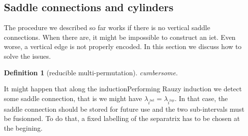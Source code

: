 \documentclass{article}
\newtheorem{definition}{Definition}
\newcommand{\commv}[1]{{\color{red!50!gray}{#1}}}
\begin{document}
\commv{TODO: implement the reduction algorithm that consists in reducing
a multi-iet to an iet via
\begin{enumerate}
\item if a gluing is available, do it
\item if there is none, perform Rauzy inductions until there is one
\end{enumerate}}

\subsection{Saddle connections and cylinders}
The procedure we described so far works if there is no vertical saddle connections.
When there are, it might be impossible to construct an iet. Even worse, a vertical
edge is not properly encoded. In this section we discuss how to solve the issues.

\begin{definition}[reducible multi-permutation]
cumbersome.
\end{definition}

It might happen that along the inductionPerforming Rauzy induction we detect some saddle connection,
that is we might have $\lambda_{i^{bot}} = \lambda_{i^{top}}$. In that case, the
saddle connection should be stored for future use and the two sub-intervals must be
fusionned. To do that, a fixed labelling of the separatrix has to be chosen at
the begining.
\end{document}
